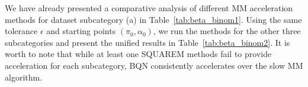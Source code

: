 \documentclass{statsoc}
\begin{document}
We have already presented a comparative analysis of different MM acceleration methods for dataset subcategory (a) in Table~\ref{tab:beta_binom1}. Using the same tolerance $\epsilon$ and starting points $(\pi_0, \alpha_0)$, we run the methods for the other three subcategories and present the unified results in Table~\ref{tab:beta_binom2}. It is worth to note that while at least one SQUAREM methods fail to provide acceleration for each subcategory, BQN consistently accelerates over the slow MM algorithm. 

\begin{table}
\caption{\label{tab:bet_binom_data}The Lidwell and Somerville (1951) cold data on households of size $4$ and corresponding MLEs under the truncated beta-binomial model.}	
\centering
{}
\end{table}
\end{document}
